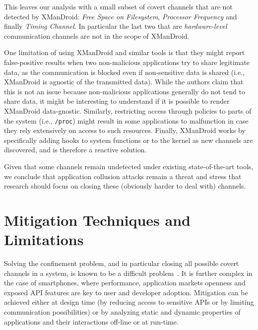 
This leaves our analysis with a small subset of covert channels that
are not detected by XManDroid: \emph{Free Space on Filesystem},
\emph{Processor Frequency} and finally \emph{Timing Channel}. In
particular the last two that are \emph{hardware-level} communication
channels are not in the scope of XManDroid.


One limitation of using XManDroid and similar tools is that they might
report false-positive results when two non-malicious applications try
to share legitimate data, as the communication is blocked even if
non-sensitive data is shared (i.e., XManDroid is agnostic of the
transmitted data). While the authors claim that this is not an issue
because non-malicious applications generally do not tend to share
data, it might be interesting to understand if it is possible to
render XManDroid data-gnostic. Similarly, restricting access through
policies to parts of the system (i.e., \texttt{/proc}) might result in
some applications to malfunction in case they rely extensively on
access to such resources. Finally, XManDroid works by specifically
adding hooks to system functions or to the kernel as new channels are
discovered, and is therefore a reactive solution.

Given that some channels remain undetected under existing
state-of-the-art tools, we conclude that application collusion attacks
remain a threat and stress that research should focus on closing these
(obviously harder to deal with) channels.

\section{Mitigation Techniques and Limitations}
\label{sec:sp_appcollusion_mitig-techn-solut}
Solving the confinement problem, and in particular closing all
possible covert channels in a system, is known to be a difficult
problem~\cite{Denning:1979:DS:356778.356782,Lipner:comment_on_confinment}. It
is further complex in the case of smartphones, where performance,
application markets openness and exposed API features are key to user
and developer adoption. Mitigation can be achieved either at design
time (by reducing access to sensitive APIs or by limiting
communication possibilities) or by analyzing static and dynamic
properties of applications and their interactions off-line or at
run-time.

